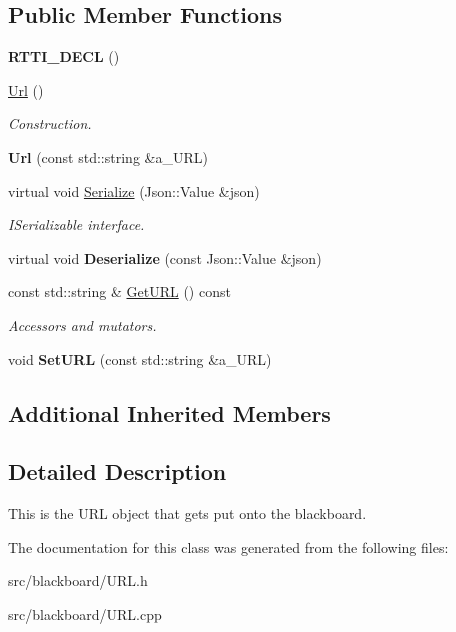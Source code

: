 \subsection*{Public Member Functions}
\begin{DoxyCompactItemize}
\item 
\mbox{\label{class_url_a22b7aa2e401a0ebf4995516f7504bd0b}} 
{\bfseries R\+T\+T\+I\+\_\+\+D\+E\+CL} ()
\item 
\mbox{\label{class_url_a76175fc053c812874335730416cbef3f}} 
\hyperlink{class_url_a76175fc053c812874335730416cbef3f}{Url} ()
\begin{DoxyCompactList}\small\item\em Construction. \end{DoxyCompactList}\item 
\mbox{\label{class_url_a5c18952f8746474ebbf607e69c0211b3}} 
{\bfseries Url} (const std\+::string \&a\+\_\+\+U\+RL)
\item 
\mbox{\label{class_url_a8e0a3855fe0aa9617310c5137900f419}} 
virtual void \hyperlink{class_url_a8e0a3855fe0aa9617310c5137900f419}{Serialize} (Json\+::\+Value \&json)
\begin{DoxyCompactList}\small\item\em I\+Serializable interface. \end{DoxyCompactList}\item 
\mbox{\label{class_url_ad6fc9d8f17835050caf19fdcc804b0e2}} 
virtual void {\bfseries Deserialize} (const Json\+::\+Value \&json)
\item 
\mbox{\label{class_url_a05e08f4ba28ffa6a3acc6f60f1e3c293}} 
const std\+::string \& \hyperlink{class_url_a05e08f4ba28ffa6a3acc6f60f1e3c293}{Get\+U\+RL} () const
\begin{DoxyCompactList}\small\item\em Accessors and mutators. \end{DoxyCompactList}\item 
\mbox{\label{class_url_abd5977a2bbcf7eefeac531c54d7dbf09}} 
void {\bfseries Set\+U\+RL} (const std\+::string \&a\+\_\+\+U\+RL)
\end{DoxyCompactItemize}
\subsection*{Additional Inherited Members}


\subsection{Detailed Description}
This is the U\+RL object that gets put onto the blackboard. 

The documentation for this class was generated from the following files\+:\begin{DoxyCompactItemize}
\item 
src/blackboard/U\+R\+L.\+h\item 
src/blackboard/U\+R\+L.\+cpp\end{DoxyCompactItemize}
